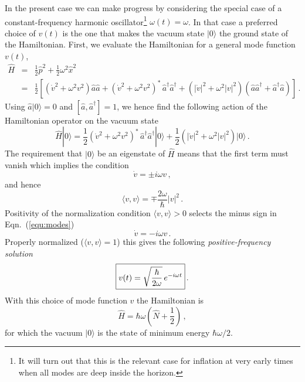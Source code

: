 \documentclass[12pt,letterpaper,rotate]{article}
\begin{document}
{\vskip 6pt
In the present case we can make progress by considering the special case of a constant-frequency harmonic oscillator\footnote{It will turn out that this is the relevant case for inflation at very early times when all modes are deep inside the horizon.} $\omega(t) =\omega$. In that case a preferred choice of $v(t)$ is the one that makes the vacuum state $|0\rangle$ the ground state of the Hamiltonian. 
First, we evaluate the Hamiltonian for a general mode function $v(t)$,
\begin{eqnarray}
\hat{H} &=& \frac{1}{2} \hat{p}^2 +\frac{1}{2} \omega^2 \hat{x}^2 \\
&=& \frac{1}{2} \left[(\dot{v}^2 + \omega^2 v^2) \hat{a} \hat{a}  + (\dot{v}^2 + \omega^2 v^2)^* \, \hat{a}^\dagger \hat{a}^\dagger +(|\dot{v}|^2 +\omega^2 |v|^2) (\hat{a}\hat{a}^\dagger + \hat{a}^\dagger \hat{a})\right]\nonumber\, .
\end{eqnarray} 
Using $\hat{a} |0\rangle =0$ and $[\hat{a},\hat{a}^\dagger]=1$, we hence find the following action of the Hamiltonian operator on the vacuum state
\begin{equation}
\hat{H} |0 \rangle = \frac{1}{2} (\dot{v}^2 + \omega^2 v^2)^*\, \hat{a}^\dagger \hat{a}^\dagger |0 \rangle + \frac{1}{2}(|\dot{v}|^2 +\omega^2 |v|^2) |0 \rangle\, . 
\end{equation}
The requirement that $|0\rangle$ be an eigenstate of $\hat{H}$ means that the first term must vanish which implies the condition
\begin{equation}
\label{equ:modes}
\dot{v} = \pm i \omega v\, ,
\end{equation}
and hence
\begin{equation}
\langle v, v \rangle = \mp \frac{2 \omega}{\hbar} |v|^2\, .
\end{equation}
Positivity of the normalization condition $\langle v, v \rangle > 0$ selects the minus sign in Eqn.~(\ref{equ:modes})
\begin{equation}
\dot{v} = - i \omega v\, .
\end{equation}
Properly normalized ($\langle v, v \rangle = 1$) this gives the following {\it positive-frequency solution} 
\begin{equation}
\label{equ:mode2}
\fbox{$\displaystyle v(t) = \sqrt{\frac{\hbar}{2 \omega}} \, e^{-i \omega t}$}\, .
\end{equation}
With this choice of mode function $v$ the Hamiltonian is
\begin{equation}
\hat{H} = \hbar \omega \left(\hat{N}+\frac{1}{2} \right)\, ,
\end{equation}
for which the vacuum $|0\rangle$ is the state of minimum energy $\hbar \omega /2$. 

}
\end{document}
